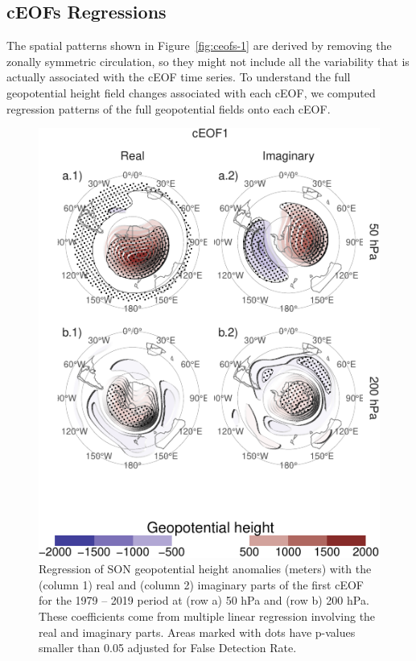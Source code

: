 \documentclass[smallextended]{svjour3}       %
\begin{document}
\hypertarget{ceofs-regressions}{%
\subsection{cEOFs Regressions}\label{ceofs-regressions}}

The spatial patterns shown in Figure~\ref{fig:ceofs-1} are derived by removing the zonally symmetric circulation, so they might not include all the variability that is actually associated with the cEOF time series.
To understand the full geopotential height field changes associated with each cEOF, we computed regression patterns of the full geopotential fields onto each cEOF.





\begin{figure}
\centering
\includegraphics{../figures/eof1-regr-gh-1.pdf}
\caption{\label{fig:eof1-regr-gh}Regression of SON geopotential height anomalies (meters) with the (column 1) real and (column 2) imaginary parts of the first cEOF for the 1979 -- 2019 period at (row a) 50 hPa and (row b) 200 hPa.
These coefficients come from multiple linear regression involving the real and imaginary parts.
Areas marked with dots have p-values smaller than 0.05 adjusted for False Detection Rate.}
\end{figure}
\end{document}
